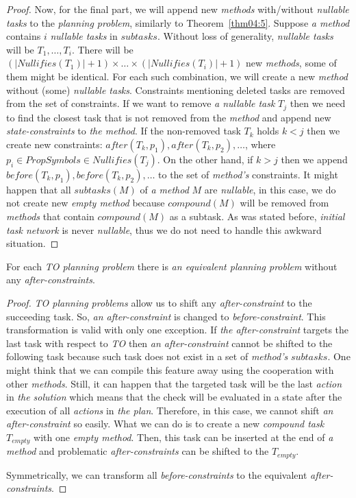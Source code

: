 \begin{proof}
    Now, for the final part, we will append new \emph{methods} with/without \emph{nullable tasks} to the \emph{planning problem}, similarly to Theorem~\ref{thm04:5}. Suppose \emph{a method} contains $i$ \emph{nullable tasks} in $subtasks$. Without loss of generality, \emph{nullable tasks} will be $T_1, \dots, T_i$. There will be $(|Nullifies(T_1)| + 1) \times \dots \times (|Nullifies(T_i)| + 1)$ new \emph{methods}, some of them might be identical. For each such combination, we will create a new \emph{method} without (some) \emph{nullable tasks}. Constraints mentioning deleted tasks are removed from the set of constraints. If we want to remove \emph{a nullable task} $T_j$ then we need to find the closest task that is not removed from the \emph{method} and append new \emph{state-constraints} to \emph{the method}. If the non-removed task $T_k$ holds $k < j$ then we create new constraints: $after(T_k, p_1), after(T_k, p_2), \dots$, where $p_i \in PropSymbols \in Nullifies(T_j)$. On the other hand, if $k > j$ then we append $before(T_k, p_1), before(T_k, p_2), \dots$ to the set of \emph{method's} constraints. It might happen that all $subtasks(M)$ of \emph{a method} $M$ are \emph{nullable}, in this case, we do not create new \emph{empty method} because $compound(M)$ will be removed from \emph{methods} that contain $compound(M)$ as a subtask. As was stated before, \emph{initial task network} is never \emph{nullable}, thus we do not need to handle this awkward situation.
\end{proof}

\begin{thm}\label{thm04:11}
    For each \emph{TO planning problem} there is \emph{an equivalent planning problem} without any \emph{after-constraints}.
\end{thm}
\begin{proof}
    \emph{TO planning problems} allow us to shift any \emph{after-constraint} to the succeeding task. So, \emph{an after-constraint} is changed to \emph{before-constraint}. This transformation is valid with only one exception. If \emph{the after-constraint} targets the last task with respect to \emph{TO} then \emph{an after-constraint} cannot be shifted to the following task because such task does not exist in a set of \emph{method's} $subtasks$. One might think that we can compile this feature away using the cooperation with other \emph{methods}. Still, it can happen that the targeted task will be the last \emph{action} in \emph{the solution} which means that the check will be evaluated in a state after the execution of all \emph{actions} in \emph{the plan}. Therefore, in this case, we cannot shift \emph{an after-constraint} so easily. What we can do is to create a new \emph{compound task} $T_{empty}$ with one \emph{empty method}. Then, this task can be inserted at the end of \emph{a method} and problematic \emph{after-constraints} can be shifted to the $T_{empty}$.

    Symmetrically, we can transform all \emph{before-constraints} to the equivalent \emph{after-constraints}.
\end{proof}

